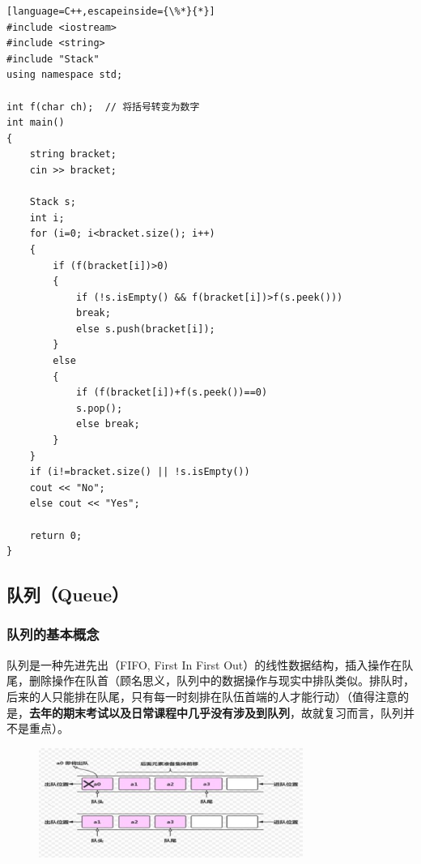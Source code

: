 \documentclass[UTF8]{ctexart}
\begin{document}

\begin{lstlisting}[language=C++,escapeinside={\%*}{*}]
#include <iostream>
#include <string>
#include "Stack"
using namespace std;

int f(char ch);  // 将括号转变为数字
int main()
{
	string bracket;
	cin >> bracket;
	
	Stack s;
	int i;
	for (i=0; i<bracket.size(); i++)
	{
		if (f(bracket[i])>0)
		{
			if (!s.isEmpty() && f(bracket[i])>f(s.peek()))
			break;
			else s.push(bracket[i]);    
		}
		else
		{
			if (f(bracket[i])+f(s.peek())==0)
			s.pop();
			else break;    
		}
	}
	if (i!=bracket.size() || !s.isEmpty())
	cout << "No";
	else cout << "Yes";
	
	return 0;
}
\end{lstlisting}
\subsection{队列（Queue）}
\subsubsection{队列的基本概念}
队列是一种先进先出（FIFO, First In First Out）的线性数据结构，插入操作在队尾，删除操作在队首（顾名思义，队列中的数据操作与现实中排队类似。排队时，后来的人只能排在队尾，只有每一时刻排在队伍首端的人才能行动）（值得注意的是，\textbf{去年的期末考试以及日常课程中几乎没有涉及到队列}，故就复习而言，队列并不是重点）。
\begin{figure}[htbp]
	\centering
	\includegraphics[width=0.77\textwidth]{picture/3.jpg}
\end{figure}
\end{document}
